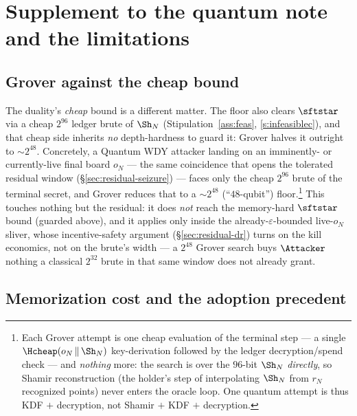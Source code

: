 \section{Supplement to the quantum note and the limitations}
\label{app:quantum}

\subsection{Grover against the cheap bound}
\label{app:quantum-grover}

\begin{remark}\label{rem:grover-residual}
The duality's \emph{cheap} bound is a different matter. The floor also clears
$\sftstar$ via a cheap $2^{96}$ ledger brute of $\Sh_N$ (Stipulation~\ref{ass:feas},
\ref{s:infeasiblec}), and that cheap side inherits \emph{no} depth-hardness to guard
it: Grover halves it outright to $\sim 2^{48}$. Concretely, a Quantum WDY attacker
landing on an imminently- or currently-live final board $o_N$ --- the same coincidence
that opens the tolerated residual window (\S\ref{sec:residual-seizure}) --- faces only the cheap
$2^{96}$ brute of the terminal secret, and Grover reduces that to a
$\sim 2^{48}$ (``$48$-qubit'') floor.\footnote{Each Grover attempt is one cheap
evaluation of the terminal step --- a single $\Hcheap(o_N \,\|\, \Sh_N)$
key-derivation followed by the ledger decryption/spend check --- and \emph{nothing}
more: the search is over the $96$-bit $\Sh_N$ \emph{directly}, so Shamir
reconstruction (the holder's step of interpolating $\Sh_N$ from $r_N$ recognized
points) never enters the oracle loop. One quantum attempt is thus KDF $+$
decryption, not Shamir $+$ KDF $+$ decryption.} This touches nothing but the
residual: it does \emph{not} reach the memory-hard $\sftstar$ bound (guarded above),
and it applies only inside the already-$\varepsilon$-bounded live-$o_N$ sliver, whose
incentive-safety argument (\S\ref{sec:residual-dr}) turns on the kill economics, not on
the brute's width --- a $2^{48}$ Grover search buys $\Attacker$ nothing a classical
$2^{32}$ brute in that same window does not already grant.
\end{remark}


\subsection{Memorization cost and the adoption precedent}
\label{app:quantum-adoption}

